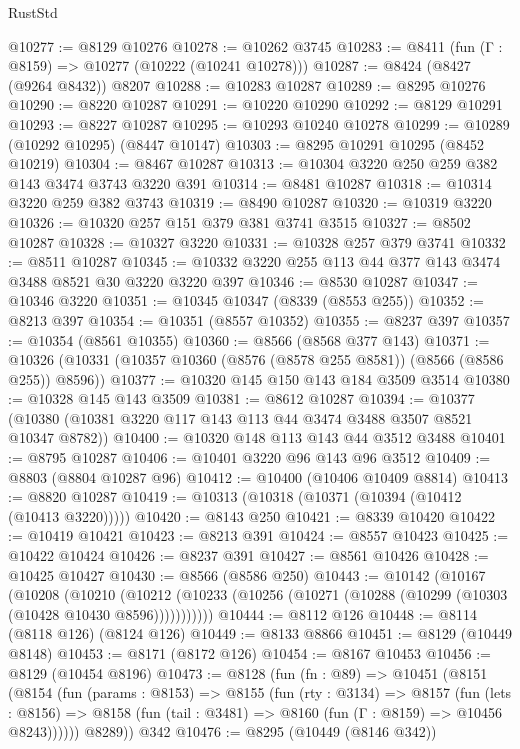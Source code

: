 \begin{lexlean}{RustStd}
\begin{coremodule}
@10277 := @8129 @10276
@10278 := @10262 @3745
@10283 := @8411 (fun (Γ : @8159) => @10277 (@10222 (@10241 @10278)))
@10287 := @8424 (@8427 (@9264 @8432)) @8207
@10288 := @10283 @10287
@10289 := @8295 @10276
@10290 := @8220 @10287
@10291 := @10220 @10290
@10292 := @8129 @10291
@10293 := @8227 @10287
@10295 := @10293 @10240 @10278
@10299 := @10289 (@10292 @10295) (@8447 @10147)
@10303 := @8295 @10291 @10295 (@8452 @10219)
@10304 := @8467 @10287
@10313 := @10304 @3220 @250 @259 @382 @143 @3474 @3743 @3220 @391
@10314 := @8481 @10287
@10318 := @10314 @3220 @259 @382 @3743
@10319 := @8490 @10287
@10320 := @10319 @3220
@10326 := @10320 @257 @151 @379 @381 @3741 @3515
@10327 := @8502 @10287
@10328 := @10327 @3220
@10331 := @10328 @257 @379 @3741
@10332 := @8511 @10287
@10345 := @10332 @3220 @255 @113 @44 @377 @143 @3474 @3488 @8521 @30 @3220 @3220 @397
@10346 := @8530 @10287
@10347 := @10346 @3220
@10351 := @10345 @10347 (@8339 (@8553 @255))
@10352 := @8213 @397
@10354 := @10351 (@8557 @10352)
@10355 := @8237 @397
@10357 := @10354 (@8561 @10355)
@10360 := @8566 (@8568 @377 @143)
@10371 := @10326 (@10331 (@10357 @10360 (@8576 (@8578 @255 @8581)) (@8566 (@8586 @255)) @8596))
@10377 := @10320 @145 @150 @143 @184 @3509 @3514
@10380 := @10328 @145 @143 @3509
@10381 := @8612 @10287
@10394 := @10377 (@10380 (@10381 @3220 @117 @143 @113 @44 @3474 @3488 @3507 @8521 @10347 @8782))
@10400 := @10320 @148 @113 @143 @44 @3512 @3488
@10401 := @8795 @10287
@10406 := @10401 @3220 @96 @143 @96 @3512
@10409 := @8803 (@8804 @10287 @96)
@10412 := @10400 (@10406 @10409 @8814)
@10413 := @8820 @10287
@10419 := @10313 (@10318 (@10371 (@10394 (@10412 (@10413 @3220)))))
@10420 := @8143 @250
@10421 := @8339 @10420
@10422 := @10419 @10421
@10423 := @8213 @391
@10424 := @8557 @10423
@10425 := @10422 @10424
@10426 := @8237 @391
@10427 := @8561 @10426
@10428 := @10425 @10427
@10430 := @8566 (@8586 @250)
@10443 := @10142
    (@10167
      (@10208
        (@10210
          (@10212 (@10233 (@10256 (@10271 (@10288 (@10299 (@10303 (@10428 @10430 @8596)))))))))))
@10444 := @8112 @126
@10448 := @8114 (@8118 @126) (@8124 @126)
@10449 := @8133 @8866
@10451 := @8129 (@10449 @8148)
@10453 := @8171 (@8172 @126)
@10454 := @8167 @10453
@10456 := @8129 (@10454 @8196)
@10473 := @8128
    (fun (fn : @89) =>
    @10451
      (@8151
        (@8154
          (fun (params : @8153) =>
          @8155
            (fun (rty : @3134) =>
            @8157
              (fun (lets : @8156) =>
              @8158 (fun (tail : @3481) => @8160 (fun (Γ : @8159) => @10456 @8243))))))
        @8289))
    @342
@10476 := @8295 (@10449 (@8146 @342))

\end{coremodule}
\end{lexlean}
